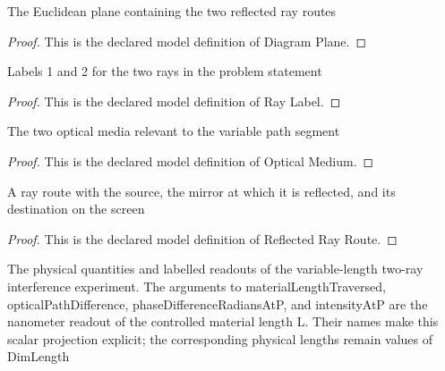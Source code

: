 \begin{definition}
  \label{def:physics:phyx-mini-0088:phyxminiproblems-problemphyxmini0088-diagramplane}
  The Euclidean plane containing the two reflected ray routes
\end{definition}
\begin{proof}
  This is the declared model definition of Diagram Plane.
\end{proof}
\begin{definition}
  \label{def:physics:phyx-mini-0088:phyxminiproblems-problemphyxmini0088-raylabel}
  Labels 1 and 2 for the two rays in the problem statement
\end{definition}
\begin{proof}
  This is the declared model definition of Ray Label.
\end{proof}
\begin{definition}
  \label{def:physics:phyx-mini-0088:phyxminiproblems-problemphyxmini0088-opticalmedium}
  The two optical media relevant to the variable path segment
\end{definition}
\begin{proof}
  This is the declared model definition of Optical Medium.
\end{proof}
\begin{definition}
  \label{def:physics:phyx-mini-0088:phyxminiproblems-problemphyxmini0088-reflectedrayroute}
  A ray route with the source, the mirror at which it is reflected, and its destination on the screen
\end{definition}
\begin{proof}
  This is the declared model definition of Reflected Ray Route.
\end{proof}
\begin{definition}
  \label{def:physics:phyx-mini-0088:phyxminiproblems-problemphyxmini0088-tworayinterferenceexperiment}
  The physical quantities and labelled readouts of the variable-length two-ray interference experiment. The arguments to materialLengthTraversed, opticalPathDifference, phaseDifferenceRadiansAtP, and intensityAtP are the nanometer readout of the controlled material length L. Their names make this scalar projection explicit; the corresponding physical lengths remain values of DimLength
\end{definition}
